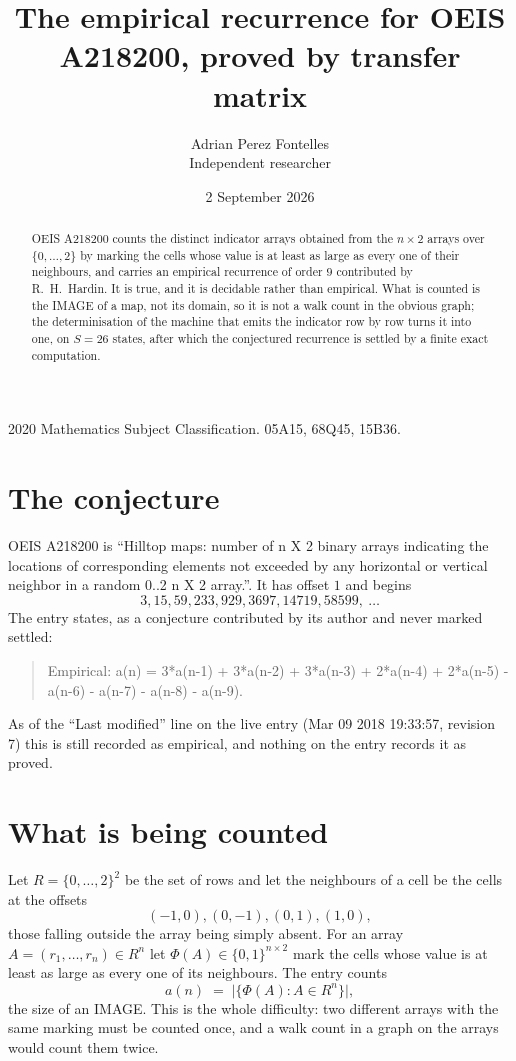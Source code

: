 \documentclass[11pt,a4paper]{article}
\title{The empirical recurrence for OEIS A218200, proved by transfer matrix}
\author{Adrian Perez Fontelles\\ \small Independent researcher}
\date{2 September 2026}
\theoremstyle{plain}
\theoremstyle{definition}
\begin{document}
\maketitle

\begin{abstract}
OEIS A218200 counts the distinct indicator arrays obtained from the $n\times2$ arrays over
$\{0,\dots,2\}$ by marking the cells whose value is at least as large as every one of their neighbours, and carries an
empirical recurrence of order $9$ contributed by R.~H.~Hardin. It is true, and it is
decidable rather than empirical. What is counted is the IMAGE of a map, not its domain, so it
is not a walk count in the obvious graph; the determinisation of the machine that emits the
indicator row by row turns it into one, on $S=26$ states, after which the conjectured
recurrence is settled by a finite exact computation.
\end{abstract}

\noindent\small 2020 Mathematics Subject Classification. 05A15, 68Q45, 15B36.\normalsize

\section{The conjecture}

OEIS A218200 is ``Hilltop maps: number of n X 2 binary arrays indicating the locations of corresponding elements not exceeded by any horizontal or vertical neighbor in a random 0..2 n X 2 array.''. It has offset $1$ and begins
\[
3, 15, 59, 233, 929, 3697, 14719, 58599,\ \dots
\]
The entry states, as a conjecture contributed by its author and never marked settled:
\begin{quote}
Empirical: a(n) = 3*a(n-1) + 3*a(n-2) + 3*a(n-3) + 2*a(n-4) + 2*a(n-5) - a(n-6) - a(n-7) - a(n-8) - a(n-9).
\end{quote}
As of the ``Last modified'' line on the live entry (Mar 09 2018 19:33:57, revision 7) this is still
recorded as empirical, and nothing on the entry records it as proved.

\section{What is being counted}

Let $R=\{0,\dots,2\}^{2}$ be the set of rows and let the neighbours of a cell be the
cells at the offsets
\[
(-1,0), (0,-1), (0,1), (1,0),
\]
those falling outside the array being simply absent. For an array
$A=(r_1,\dots,r_n)\in R^n$ let $\Phi(A)\in\{0,1\}^{n\times2}$ mark the cells whose value
is at least as large as every one of its neighbours. The entry counts
\[
a(n)\;=\;\bigl|\{\Phi(A):A\in R^n\}\bigr| ,
\]
the size of an IMAGE. This is the whole difficulty: two different arrays with the same marking
must be counted once, and a walk count in a graph on the arrays would count them twice.
\end{document}

